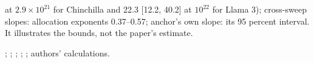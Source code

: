\begin{table}[tp]
\begin{tablenotes}
at $2.9\times10^{21}$ for Chinchilla and 22.3 [12.2, 40.2] at $10^{22}$ for Llama 3); cross-sweep slopes: allocation
exponents 0.37--0.57; anchor's own slope: its 95 percent interval. It illustrates the bounds, not the paper's estimate.
\end{tablenotes}
\begin{tablenotes}[Source]
\citet{hoffmann2022training}; \citet{grattafiori2024llama}; \citet{marin2026ladders}; \citet{bi2024deepseek};
\citet{hu2024minicpm}; authors' calculations.
\end{tablenotes}
\end{table}
